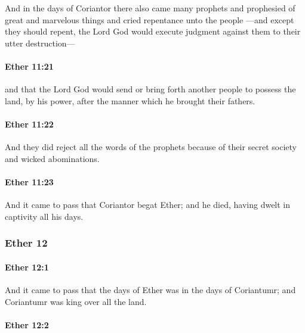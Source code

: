 			And in the days of Coriantor there also came many prophets
			and prophesied of great and marvelous things
			and cried repentance unto the people
			---and except they should repent,
			the Lord God would execute judgment against them to their utter destruction---

		\paragraph{Ether 11:21} %
			\label{ETHER-11-21}

			and that the Lord God would send or bring forth
			another people to possess the land,
			by his power, after the manner which he brought their fathers.

		\paragraph{Ether 11:22} %
			\label{ETHER-11-22}

			And they did reject all the words of the prophets
			because of their secret society and wicked abominations.

		\paragraph{Ether 11:23} %
			\label{ETHER-11-23}

			And it came to pass that Coriantor begat Ether;
			and he died, having dwelt in captivity all his days.

	\subsubsection{Ether 12} %
		\label{ETHER-12}
		
		\paragraph{Ether 12:1} %
			\label{ETHER-12-1}

			And it came to pass that the days of Ether was in the days of Coriantumr;
			and Coriantumr was king over all the land.

		\paragraph{Ether 12:2} %
			\label{ETHER-12-2}

